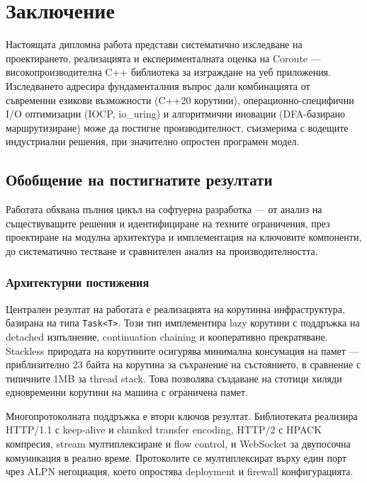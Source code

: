 \section{Заключение}
\label{sec:conclusion}

Настоящата дипломна работа представи систематично изследване на проектирането, реализацията и експерименталната оценка на Coroute --- високопроизводителна C++ библиотека за изграждане на уеб приложения. Изследването адресира фундаменталния въпрос дали комбинацията от съвременни езикови възможности (C++20 корутини), операционно-специфични I/O оптимизации (IOCP, io\_uring) и алгоритмични иновации (DFA-базирано маршрутизиране) може да постигне производителност, съизмерима с водещите индустриални решения, при значително опростен програмен модел.

\subsection{Обобщение на постигнатите резултати}

Работата обхвана пълния цикъл на софтуерна разработка --- от анализ на съществуващите решения и идентифициране на техните ограничения, през проектиране на модулна архитектура и имплементация на ключовите компоненти, до систематично тестване и сравнителен анализ на производителността.

\subsubsection{Архитектурни постижения}

Централен резултат на работата е реализацията на корутинна инфраструктура, базирана на типа \texttt{Task<T>}. Този тип имплементира lazy корутини с поддръжка на detached изпълнение, continuation chaining и кооперативно прекратяване. Stackless природата на корутините осигурява минимална консумация на памет --- приблизително 23 байта на корутина за съхранение на състоянието, в сравнение с типичните 1MB за thread stack. Това позволява създаване на стотици хиляди едновременни корутини на машина с ограничена памет.

Многопротоколната поддръжка е втори ключов резултат. Библиотеката реализира HTTP/1.1 с keep-alive и chunked transfer encoding, HTTP/2 с HPACK компресия, stream мултиплексиране и flow control, и WebSocket за двупосочна комуникация в реално време. Протоколите се мултиплексират върху един порт чрез ALPN негоциация, което опростява deployment и firewall конфигурацията.

